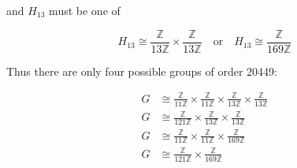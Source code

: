 \documentclass{article}
\begin{document}
and $H_{13}$ must be one of

\begin{equation*}
    H_{13} \cong \frac{\mathbb{Z}}{13\mathbb{Z}} \times \frac{\mathbb{Z}}{13\mathbb{Z}} \quad \text{or} \quad H_{13} \cong \frac{\mathbb{Z}}{169\mathbb{Z}}
\end{equation*}

Thus there are only four possible groups of order 20449:

\begin{align*}
    G &\cong \frac{\mathbb{Z}}{11\mathbb{Z}} \times \frac{\mathbb{Z}}{11\mathbb{Z}} \times \frac{\mathbb{Z}}{13\mathbb{Z}} \times \frac{\mathbb{Z}}{13\mathbb{Z}} \\
    G &\cong \frac{\mathbb{Z}}{121\mathbb{Z}} \times \frac{\mathbb{Z}}{13\mathbb{Z}} \times \frac{\mathbb{Z}}{13\mathbb{Z}} \\
    G &\cong \frac{\mathbb{Z}}{11\mathbb{Z}} \times \frac{\mathbb{Z}}{11\mathbb{Z}} \times \frac{\mathbb{Z}}{169\mathbb{Z}} \\
    G &\cong \frac{\mathbb{Z}}{121\mathbb{Z}} \times \frac{\mathbb{Z}}{169\mathbb{Z}}
\end{align*}
\end{document}
